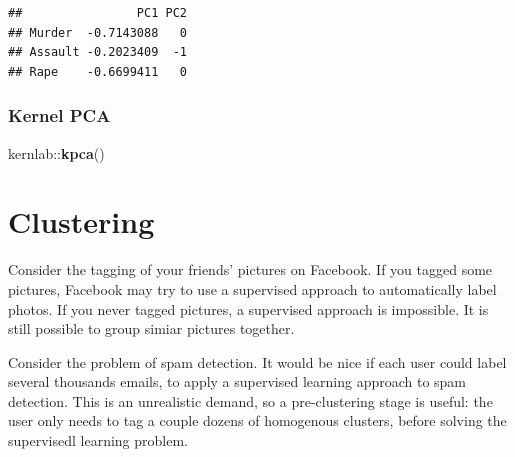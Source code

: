 \documentclass[]{book}
\newenvironment{Shaded}{\begin{snugshade}}{\end{snugshade}}
\newcommand{\KeywordTok}[1]{\textcolor[rgb]{0.13,0.29,0.53}{\textbf{{#1}}}}
\newcommand{\DataTypeTok}[1]{\textcolor[rgb]{0.13,0.29,0.53}{{#1}}}
\newcommand{\DecValTok}[1]{\textcolor[rgb]{0.00,0.00,0.81}{{#1}}}
\newcommand{\FloatTok}[1]{\textcolor[rgb]{0.00,0.00,0.81}{{#1}}}
\newcommand{\StringTok}[1]{\textcolor[rgb]{0.31,0.60,0.02}{{#1}}}
\newcommand{\CommentTok}[1]{\textcolor[rgb]{0.56,0.35,0.01}{\textit{{#1}}}}
\newcommand{\OtherTok}[1]{\textcolor[rgb]{0.56,0.35,0.01}{{#1}}}
\newcommand{\NormalTok}[1]{{#1}}
\theoremstyle{definition}
\theoremstyle{definition}
\theoremstyle{remark}
\let\BeginKnitrBlock\begin \let\EndKnitrBlock\end
\begin{document}
\begin{Shaded}
\end{Shaded}

\begin{verbatim}
##                PC1 PC2
## Murder  -0.7143088   0
## Assault -0.2023409  -1
## Rape    -0.6699411   0
\end{verbatim}

\subsubsection{Kernel PCA}\label{kernel-pca-1}

\begin{Shaded}
\begin{Highlighting}[]
\NormalTok{kernlab::}\KeywordTok{kpca}\NormalTok{()}
\end{Highlighting}
\end{Shaded}

\section{Clustering}\label{cluster}

\BeginKnitrBlock{example}
\protect\hypertarget{ex:photos}{}{\label{ex:photos}}Consider the tagging of
your friends' pictures on Facebook. If you tagged some pictures,
Facebook may try to use a supervised approach to automatically label
photos. If you never tagged pictures, a supervised approach is
impossible. It is still possible to group simiar pictures together.
\EndKnitrBlock{example}

\BeginKnitrBlock{example}
\protect\hypertarget{ex:spam}{}{\label{ex:spam}}Consider the problem of spam
detection. It would be nice if each user could label several thousands
emails, to apply a supervised learning approach to spam detection. This
is an unrealistic demand, so a pre-clustering stage is useful: the user
only needs to tag a couple dozens of homogenous clusters, before solving
the supervisedl learning problem.
\EndKnitrBlock{example}
\end{document}
